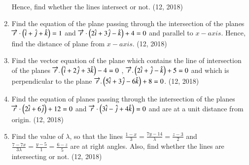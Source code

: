 \begin{enumerate}[label=\thesubsection.\arabic*, ref=\thesubsection.\theenumi]
Hence, find whether the lines intersect or not. \hfill (12, 2018)
\item Find the equation of the plane passing through the intersection of the planes $\overrightarrow{r} \cdot\left(\hat{i} + \hat{j} + \hat{k}\right)=1$ and $\overrightarrow{r} \cdot \left( 2\hat{i}+3\hat{j}-\hat{k}\right) +4=0$ and parallel to $x-axis$. Hence, find the distance of plane from $x-axis$.
\hfill (12, 2018)
\item Find the vector equation of the plane which contains the line of intersection of the planes $ \overrightarrow{r}.\left(\hat{i} + 2\hat{j}+3\hat{k}\right)-4=0$ , $\overrightarrow{r}.\left(2\hat{i} + \hat{j} - \hat{k}\right)+5=0$ and which is perpendicular to the plane $\overrightarrow{r}.\left(5\hat{i} + 3\hat{j} - 6\hat{k}\right)+8=0$.
\hfill (12, 2018)
\item Find the equation of planes passing through the intersection  of the planes $\overrightarrow{r} \cdot \left(2\hat{i}+6\hat{j}\right)+12=0$ and $\overrightarrow{r} \cdot \left(3\hat{i}-\hat{j}+4\hat{k}\right)=0$ and are at a unit distance from origin.
\hfill (12, 2018) 
\item Find the value of $\lambda$, so that the lines $\frac{1-x}{3}=\frac{7y-14}{\lambda}=\frac{z-3}{2}$ and $\frac{7-7x}{3\lambda}=\frac{y-5}{1}=\frac{6-z}{5}$ are at right angles. Also, find whether the lines are intersecting or not.       
\hfill (12, 2018) 

\end{enumerate}
